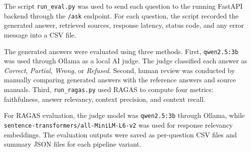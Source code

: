 The script \texttt{run\_eval.py} was used to send each question to the running FastAPI backend through the \texttt{/ask} endpoint. For each question, the script recorded the generated answer, retrieved sources, response latency, status code, and any error message into a CSV file.

The generated answers were evaluated using three methods. First, \texttt{qwen2.5:3b} was used through Ollama as a local AI judge. The judge classified each answer as \textit{Correct}, \textit{Partial}, \textit{Wrong}, or \textit{Refused}. Second, human review was conducted by manually comparing generated answers with the reference answers and source manuals. Third, \texttt{run\_ragas.py} used RAGAS to compute four metrics: faithfulness, answer relevancy, context precision, and context recall.

For RAGAS evaluation, the judge model was \texttt{qwen2.5:3b} through Ollama, while \texttt{sentence-transformers/all-MiniLM-L6-v2} was used for response relevancy embeddings. The evaluation outputs were saved as per-question CSV files and summary JSON files for each pipeline variant.
